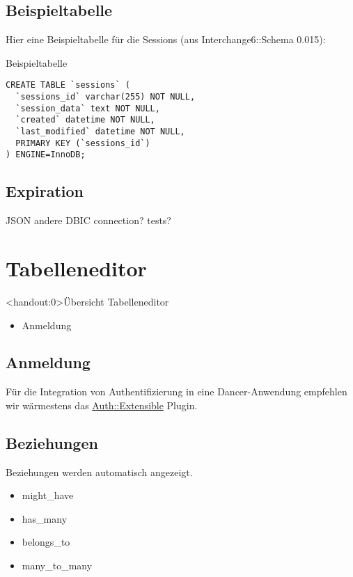 \subsection{Beispieltabelle}

Hier eine Beispieltabelle für die Sessions (aus
Interchange6::Schema 0.015):

\begin{frame}[fragile]{Beispieltabelle}
\begin{lstlisting}
CREATE TABLE `sessions` (
  `sessions_id` varchar(255) NOT NULL,
  `session_data` text NOT NULL,
  `created` datetime NOT NULL,
  `last_modified` datetime NOT NULL,
  PRIMARY KEY (`sessions_id`)
) ENGINE=InnoDB;
\end{lstlisting}
\end{frame}

\subsection{Expiration}

JSON
andere DBIC connection?
tests?

\section{Tabelleneditor}

\begin{frame}<handout:0>{Übersicht Tabelleneditor}
\begin{itemize}
\item Anmeldung
\end{itemize}
\end{frame}

\subsection{Anmeldung}

Für die Integration von Authentifizierung in eine Dancer-Anwendung empfehlen
wir wärmestens das
\href{https://metacpan.org/pod/Dancer::Plugin::Auth::Extensible}{Auth::Extensible}
Plugin.

\subsection{Beziehungen}

Beziehungen werden automatisch angezeigt.

\begin{frame}
\begin{itemize}
\item might\_have
\item has\_many
\item belongs\_to
\item many\_to\_many
\end{itemize}
\end{frame}

